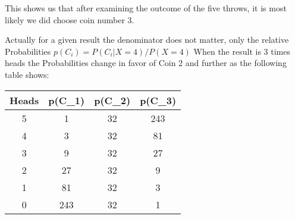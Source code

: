 \documentclass[slidemain.tex]{subfiles}
\begin{document}
\begin{frame}
This shows us that after examining the outcome of the five throws, it is most likely we did choose coin number 3.

Actually for a given result the denominator does not matter, only the relative Probabilities $p(C_i) = P(C_i|X=4)/P(X=4)$ When the result is 3 times heads the Probabilities change in favor of Coin 2 and further as the following table shows:
\begin{tabular}{|c|c|c|c|}
Heads &	p(C\_1) &	p(C\_2) &	p(C\_3)  \\ \hline
5	& 1	& 32&	243 \\
4	& 3	& 32 &	81 \\
3	& 9	& 32 &	27\\
2	& 27 &	32&	9\\
1	& 81 &	32&	3\\
0	& 243 &	32&	1\\ 
\end{tabular} 
\end{frame}
\end{document}
